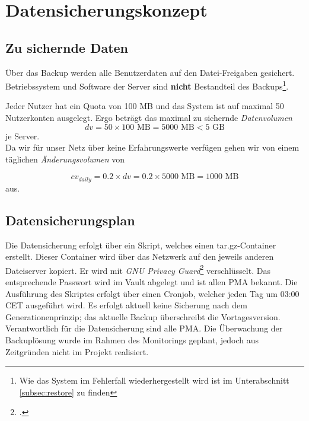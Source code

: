 \newpage
\section{Datensicherungskonzept}
\subsection{Zu sichernde Daten}
Über das Backup werden alle Benutzerdaten auf den Datei-Freigaben gesichert. Betriebssystem und Software der Server sind \textbf{nicht} Bestandteil des Backups\footnote{Wie das System im Fehlerfall wiederhergestellt wird ist im Unterabschnitt \ref{subsec:restore} zu finden}.

Jeder Nutzer hat ein Quota von 100 MB und das System ist auf maximal 50 Nutzerkonten ausgelegt. Ergo beträgt das maximal zu sichernde \emph{Datenvolumen}
\begin{equation}
dv = 50 \times 100 \text{ MB} = 5000 \text{ MB} < 5 \text{ GB}
\end{equation}
je Server.\\

Da wir für unser Netz über keine Erfahrungswerte verfügen gehen wir von einem täglichen \emph{Änderungsvolumen} von

\begin{equation}
cv_{daily} = 0.2 \times dv = 0.2 \times 5000 \text { MB} = 1000 \text{ MB}
\end{equation}
aus.

\subsection{Datensicherungsplan}
Die Datensicherung erfolgt über ein Skript, welches einen tar.gz-Container erstellt. Dieser Container wird über das Netzwerk auf den jeweils anderen Dateiserver kopiert. Er wird mit \emph{GNU Privacy Guard}\footcite{gnupg} verschlüsselt. Das entsprechende Passwort wird im Vault abgelegt und ist allen PMA bekannt. Die Ausführung des Skriptes erfolgt über einen Cronjob, welcher jeden Tag um 03:00 CET ausgeführt wird. Es erfolgt aktuell keine Sicherung nach dem Generationenprinzip; das aktuelle Backup überschreibt die Vortagesversion. Verantwortlich für die Datensicherung sind alle PMA. Die Überwachung der Backuplösung wurde im Rahmen des Monitorings geplant, jedoch aus Zeitgründen nicht im Projekt realisiert.\\

